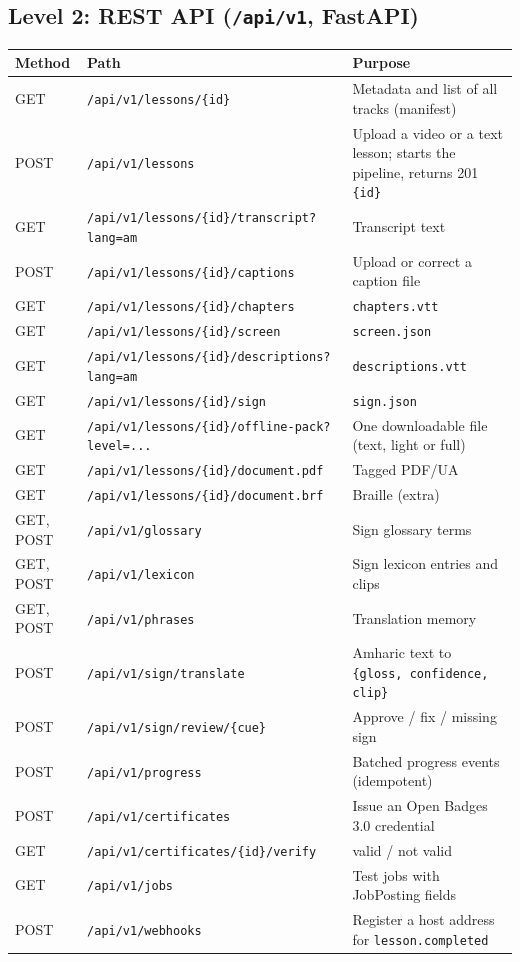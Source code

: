 \documentclass[11pt,a4paper]{article}
\newcommand{\code}[1]{\texttt{#1}}
\begin{document}
\subsection{Level 2: REST API (\code{/api/v1}, FastAPI)}
{\footnotesize
\begin{xltabular}{\textwidth}{@{}l >{\raggedright\arraybackslash}p{6.4cm} X@{}}
\toprule
\textbf{Method} & \textbf{Path} & \textbf{Purpose} \\
\midrule
\endhead
GET & \code{/api/v1/lessons/\{id\}} & Metadata and list of all tracks (manifest) \\
POST & \code{/api/v1/lessons} & Upload a video or a text lesson; starts the pipeline, returns 201 \code{\{id\}} \\
GET & \code{/api/v1/lessons/\{id\}/transcript?lang=am} & Transcript text \\
POST & \code{/api/v1/lessons/\{id\}/captions} & Upload or correct a caption file \\
GET & \code{/api/v1/lessons/\{id\}/chapters} & \code{chapters.vtt} \\
GET & \code{/api/v1/lessons/\{id\}/screen} & \code{screen.json} \\
GET & \code{/api/v1/lessons/\{id\}/descriptions?lang=am} & \code{descriptions.vtt} \\
GET & \code{/api/v1/lessons/\{id\}/sign} & \code{sign.json} \\
GET & \code{/api/v1/lessons/\{id\}/offline-pack?level=...} & One downloadable file (text, light or full) \\
GET & \code{/api/v1/lessons/\{id\}/document.pdf} & Tagged PDF/UA \\
GET & \code{/api/v1/lessons/\{id\}/document.brf} & Braille (extra) \\
GET, POST & \code{/api/v1/glossary} & Sign glossary terms \\
GET, POST & \code{/api/v1/lexicon} & Sign lexicon entries and clips \\
GET, POST & \code{/api/v1/phrases} & Translation memory \\
POST & \code{/api/v1/sign/translate} & Amharic text to \code{\{gloss, confidence, clip\}} \\
POST & \code{/api/v1/sign/review/\{cue\}} & Approve / fix / missing sign \\
POST & \code{/api/v1/progress} & Batched progress events (idempotent) \\
POST & \code{/api/v1/certificates} & Issue an Open Badges 3.0 credential \\
GET & \code{/api/v1/certificates/\{id\}/verify} & valid / not valid \\
GET & \code{/api/v1/jobs} & Test jobs with JobPosting fields \\
POST & \code{/api/v1/webhooks} & Register a host address for \code{lesson.completed} \\
\bottomrule
\end{xltabular}
}
\end{document}
